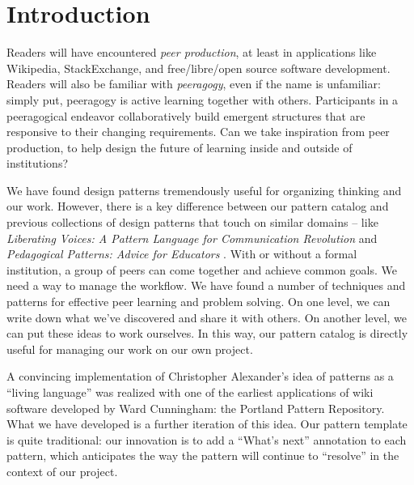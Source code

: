 
\section{Introduction}\label{sec:Introduction}

Readers will have encountered \emph{peer production}, at least in applications like Wikipedia, StackExchange, and free/libre/open source software development.   
%
Readers will also be familiar with \emph{peeragogy}, even if the name is unfamiliar: simply put, peeragogy is active learning together with others.  Participants in a peeragogical endeavor collaboratively build emergent  structures that are responsive to their changing requirements.
%
Can we take inspiration from peer production, to help design the future of learning inside and outside of institutions?



We have found design patterns tremendously useful for organizing thinking and our work.  However, there is a key difference between our pattern catalog and previous collections of design patterns that touch on similar domains -- like \emph{Liberating Voices: A Pattern Language for Communication Revolution} \cite{schuler2008liberating} and \emph{Pedagogical Patterns: Advice for Educators} \cite{bergin2012pedagogical}.
%
With or without a formal institution, a group of peers can come together and achieve common goals.  We need a way to manage the workflow.  We have found a number of techniques and patterns for effective peer learning and problem solving.  On one level, we can write down what we've discovered and share it with others.  On another level, we can put these ideas to work ourselves.  In this way, our pattern catalog is directly useful for managing our work on our own project.



A convincing implementation of Christopher Alexander’s idea of patterns as a ``living language'' \cite[p.~xvii]{alexander1977pattern} was realized with one of the earliest applications of wiki software developed by Ward Cunningham: the Portland Pattern Repository.  What we have developed is a further iteration of this idea.   Our pattern template is quite traditional: our innovation is to add a ``What's next'' annotation to each pattern, which anticipates the way the pattern will continue to ``resolve'' in the context of our project. 



